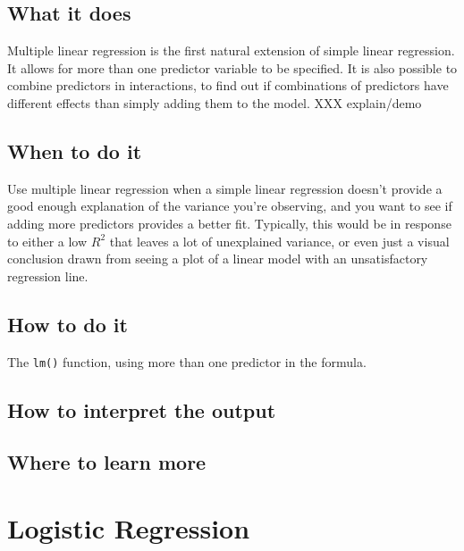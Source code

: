 \documentclass[
]{book}
\begin{document}
\hypertarget{what-it-does-1}{%
\section{What it does}\label{what-it-does-1}}

Multiple linear regression is the first natural extension of simple linear regression. It allows for more than one predictor variable to be specified. It is also possible to combine predictors in interactions, to find out if combinations of predictors have different effects than simply adding them to the model. XXX explain/demo

\hypertarget{when-to-do-it-1}{%
\section{When to do it}\label{when-to-do-it-1}}

Use multiple linear regression when a simple linear regression doesn't provide a good enough explanation of the variance you're observing, and you want to see if adding more predictors provides a better fit. Typically, this would be in response to either a low \(R^2\) that leaves a lot of unexplained variance, or even just a visual conclusion drawn from seeing a plot of a linear model with an unsatisfactory regression line.

\hypertarget{how-to-do-it-1}{%
\section{How to do it}\label{how-to-do-it-1}}

The \texttt{lm()} function, using more than one predictor in the formula.

\hypertarget{how-to-interpret-the-output-1}{%
\section{How to interpret the output}\label{how-to-interpret-the-output-1}}

\hypertarget{where-to-learn-more-1}{%
\section{Where to learn more}\label{where-to-learn-more-1}}

\hypertarget{logistic-regression}{%
\chapter{Logistic Regression}\label{logistic-regression}}
\end{document}
